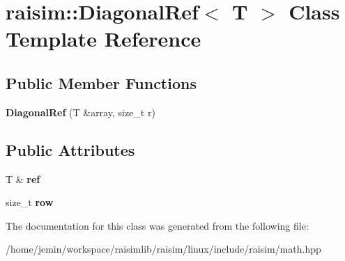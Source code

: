 \hypertarget{classraisim_1_1DiagonalRef}{}\section{raisim\+:\+:Diagonal\+Ref$<$ T $>$ Class Template Reference}
\label{classraisim_1_1DiagonalRef}
\subsection*{Public Member Functions}
\begin{DoxyCompactItemize}
\item 
\mbox{\label{classraisim_1_1DiagonalRef_a5a584ce2433d51d0d4d3cca435dee000}} 
{\bfseries Diagonal\+Ref} (T \&array, size\+\_\+t r)
\end{DoxyCompactItemize}
\subsection*{Public Attributes}
\begin{DoxyCompactItemize}
\item 
\mbox{\label{classraisim_1_1DiagonalRef_a91a7281ae27d4b9ef3d3ebb948a8fcf5}} 
T \& {\bfseries ref}
\item 
\mbox{\label{classraisim_1_1DiagonalRef_a10f422a76de5e72ebe19e4859591ef95}} 
size\+\_\+t {\bfseries row}
\end{DoxyCompactItemize}


The documentation for this class was generated from the following file\+:\begin{DoxyCompactItemize}
\item 
/home/jemin/workspace/raisimlib/raisim/linux/include/raisim/math.\+hpp\end{DoxyCompactItemize}
